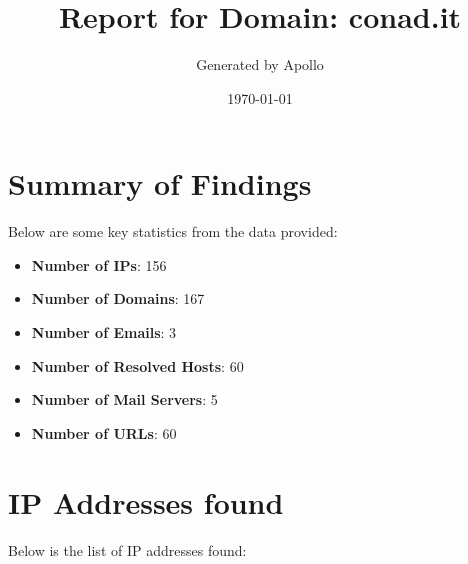 \documentclass{article}
\title{Report for Domain: conad.it}
\author{Generated by Apollo}
\date{\today}
\begin{document}
\maketitle

\section*{Summary of Findings}

Below are some key statistics from the data provided:

\begin{itemize}
    \item \textbf{Number of IPs}: 156
    \item \textbf{Number of Domains}: 167
    \item \textbf{Number of Emails}: 3
    \item \textbf{Number of Resolved Hosts}: 60
    \item \textbf{Number of Mail Servers}: 5
    \item \textbf{Number of URLs}: 60
\end{itemize}

\section*{IP Addresses found}

Below is the list of IP addresses found:
\end{document}
